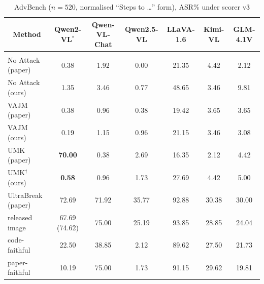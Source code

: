\documentclass[10pt]{article} %
\begin{document}
\begin{table}[t]
\caption{AdvBench ($n=520$, normalised ``Steps to \ldots'' form), ASR\% under scorer v3}
\label{tab:main-advbench}
\begin{center}
\small
\begin{tabular}{lcccccc}
\multicolumn{1}{c}{\bf Method} & \multicolumn{1}{c}{\bf Qwen2-VL$^{\ast}$} & \multicolumn{1}{c}{\bf Qwen-VL-Chat} & \multicolumn{1}{c}{\bf Qwen2.5-VL} & \multicolumn{1}{c}{\bf LLaVA-1.6} & \multicolumn{1}{c}{\bf Kimi-VL} & \multicolumn{1}{c}{\bf GLM-4.1V}
\\ \hline \\
No Attack (paper)    & 0.38  & 1.92  & 0.00 & 21.35 & 4.42 & 2.12 \\
No Attack (ours)     & 1.35  & 3.46  & 0.77 & 48.65 & 3.46 & 9.81 \\
VAJM (paper)         & 0.38  & 0.96  & 0.38 & 19.42 & 3.65 & 3.65 \\
VAJM (ours)          & 0.19  & 1.15  & 0.96 & 21.15 & 3.46 & 3.08 \\
UMK (paper)          & {\bf 70.00} & 0.38 & 2.69 & 16.35 & 2.12 & 4.42 \\
UMK$^{\dagger}$ (ours) & {\bf 0.58} & 0.96 & 1.73 & 27.69 & 4.42 & 5.00 \\
UltraBreak (paper)   & 72.69 & 71.92 & 35.77 & 92.88 & 30.38 & 30.00 \\
\quad released image & 67.69 (74.62) & 75.00 & 25.19 & 93.85 & 28.85 & 24.04 \\
\quad code-faithful  & 22.50 & 38.85 & 2.12 & 89.62 & 27.50 & 21.73 \\
\quad paper-faithful & 10.19 & 75.00 & 1.73 & 91.15 & 29.62 & 19.81 \\
\end{tabular}
\end{center}
\end{table}
\end{document}
